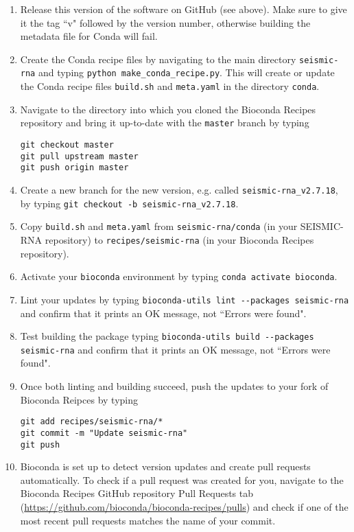 \documentclass[main.tex]{subfiles}
\begin{document}
\begin{enumerate}
    \item Release this version of the software on GitHub (see above). Make sure to give it the tag ``v" followed by the version number, otherwise building the metadata file for Conda will fail.
    \item Create the Conda recipe files by navigating to the main directory \verb|seismic-rna| and typing \verb|python make_conda_recipe.py|. This will create or update the Conda recipe files \verb|build.sh| and \verb|meta.yaml| in the directory \verb|conda|.
    \item Navigate to the directory into which you cloned the Bioconda Recipes repository and bring it up-to-date with the \verb|master| branch by typing
        \begin{verbatim}
git checkout master
git pull upstream master
git push origin master
        \end{verbatim}
    \item Create a new branch for the new version, e.g. called \verb|seismic-rna_v2.7.18|, by typing \verb|git checkout -b seismic-rna_v2.7.18|.
    \item Copy \verb|build.sh| and \verb|meta.yaml| from \verb|seismic-rna/conda| (in your SEISMIC-RNA repository) to \verb|recipes/seismic-rna| (in your Bioconda Recipes repository).
    \item Activate your \verb|bioconda| environment by typing \verb|conda activate bioconda|.
    \item Lint your updates by typing \verb|bioconda-utils lint --packages seismic-rna| and confirm that it prints an OK message, not ``Errors were found".
    \item Test building the package typing \verb|bioconda-utils build --packages seismic-rna| and confirm that it prints an OK message, not ``Errors were found".
    \item Once both linting and building succeed, push the updates to your fork of Bioconda Reipces by typing
    	\begin{verbatim}
git add recipes/seismic-rna/*
git commit -m "Update seismic-rna"
git push
        \end{verbatim}
    \item Bioconda is set up to detect version updates and create pull requests automatically. To check if a pull request was created for you, navigate to the Bioconda Recipes GitHub repository Pull Requests tab (\url{https://github.com/bioconda/bioconda-recipes/pulls}) and check if one of the most recent pull requests matches the name of your commit.

\end{enumerate}
\end{document}
